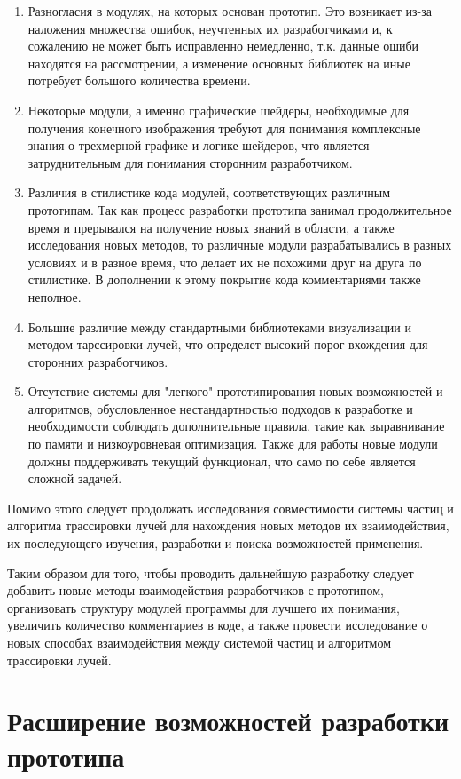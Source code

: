 \begin{enumerate} 
	\item Разногласия в модулях, на которых основан прототип. Это возникает из-за  наложения множества ошибок, неучтенных их разработчиками и, к сожалению не может быть исправленно немедленно, т.к. данные ошиби находятся на рассмотрении, а изменение основных библиотек на иные потребует большого количества времени.
	\item Некоторые модули, а именно графические шейдеры, необходимые для получения конечного  изображения требуют для понимания комплексные знания о трехмерной графике и логике шейдеров, что является затруднительным для понимания сторонним разработчиком.
	\item Различия в стилистике кода модулей, соответствующих различным прототипам. Так как процесс разработки прототипа занимал продолжительное время и прерывался на получение новых знаний в области, а также исследования новых методов, то различные модули разрабатывались в разных условиях и в разное время, что делает их не похожими друг на друга по стилистике. В дополнении к этому покрытие кода комментариями также неполное.
	\item Большие различие между стандартными библиотеками визуализации и методом тарссировки лучей, что определет высокий порог вхождения для сторонних разработчиков.
	\item Отсутствие системы для "легкого" прототипирования новых возможностей и алгоритмов, обусловленное нестандартностью подходов к разработке и необходимости соблюдать дополнительные правила, такие как выравнивание по памяти и низкоуровневая оптимизация. Также для работы новые модули должны поддерживать текущий функционал, что само по себе является сложной задачей.
\end{enumerate}


Помимо этого следует продолжать исследования совместимости системы частиц и алгоритма трассировки лучей для нахождения новых методов их взаимодействия, их последующего изучения, разработки и поиска возможностей применения.

Таким образом для того, чтобы проводить дальнейшую разработку следует добавить новые методы взаимодействия разработчиков с прототипом, организовать структуру модулей программы для лучшего их понимания, увеличить количество комментариев в коде, а также провести исследование о новых способах взаимодействия между системой частиц и алгоритмом трассировки лучей.

\section{Расширение возможностей разработки прототипа}

